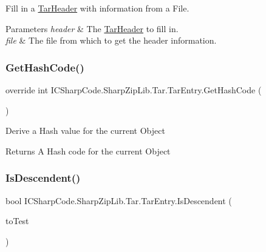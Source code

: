 Fill in a \hyperlink{class_i_c_sharp_code_1_1_sharp_zip_lib_1_1_tar_1_1_tar_header}{Tar\+Header} with information from a File. 


\begin{DoxyParams}{Parameters}
{\em header} & The \hyperlink{class_i_c_sharp_code_1_1_sharp_zip_lib_1_1_tar_1_1_tar_header}{Tar\+Header} to fill in. \\
\hline
{\em file} & The file from which to get the header information. \\
\hline
\end{DoxyParams}
\mbox{\label{class_i_c_sharp_code_1_1_sharp_zip_lib_1_1_tar_1_1_tar_entry_a7570e02c6a85b336d2c0bcc6ed4d6526}} 
\subsubsection{\texorpdfstring{Get\+Hash\+Code()}{GetHashCode()}}
{\footnotesize\ttfamily override int I\+C\+Sharp\+Code.\+Sharp\+Zip\+Lib.\+Tar.\+Tar\+Entry.\+Get\+Hash\+Code (\begin{DoxyParamCaption}{ }\end{DoxyParamCaption})\hspace{0.3cm}{\ttfamily [inline]}}



Derive a Hash value for the current Object 

\begin{DoxyReturn}{Returns}
A Hash code for the current Object
\end{DoxyReturn}
\mbox{\label{class_i_c_sharp_code_1_1_sharp_zip_lib_1_1_tar_1_1_tar_entry_a35b68e2b14c520f4ab7f3fc1fa900e66}} 
\subsubsection{\texorpdfstring{Is\+Descendent()}{IsDescendent()}}
{\footnotesize\ttfamily bool I\+C\+Sharp\+Code.\+Sharp\+Zip\+Lib.\+Tar.\+Tar\+Entry.\+Is\+Descendent (\begin{DoxyParamCaption}\item[{\hyperlink{class_i_c_sharp_code_1_1_sharp_zip_lib_1_1_tar_1_1_tar_entry}{Tar\+Entry}}]{to\+Test }\end{DoxyParamCaption})\hspace{0.3cm}{\ttfamily [inline]}}




